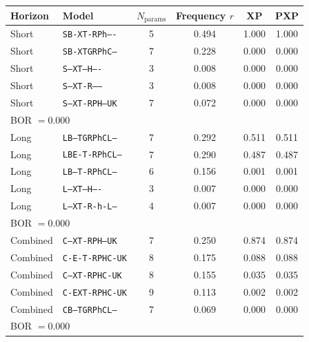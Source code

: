 \begin{tabular}{llcccc}
\toprule
Horizon & Model & $N_{\text{params}}$ & Frequency $r$ & XP & PXP \\
\midrule
Short & \texttt{SB-XT-RPh----} & 5 & 0.494 & 1.000 & 1.000 \\
Short & \texttt{SB-XTGRPhC---} & 7 & 0.228 & 0.000 & 0.000 \\
Short & \texttt{S--XT---H----} & 3 & 0.008 & 0.000 & 0.000 \\
Short & \texttt{S--XT-R------} & 3 & 0.008 & 0.000 & 0.000 \\
Short & \texttt{S--XT-RPH--UK} & 7 & 0.072 & 0.000 & 0.000 \\
\multicolumn{6}{l}{\quad\footnotesize BOR $= 0.000$} \\
\midrule
Long & \texttt{LB--TGRPhCL--} & 7 & 0.292 & 0.511 & 0.511 \\
Long & \texttt{LBE-T-RPhCL--} & 7 & 0.290 & 0.487 & 0.487 \\
Long & \texttt{LB--T-RPhCL--} & 6 & 0.156 & 0.001 & 0.001 \\
Long & \texttt{L--XT---H----} & 3 & 0.007 & 0.000 & 0.000 \\
Long & \texttt{L--XT-R-h-L--} & 4 & 0.007 & 0.000 & 0.000 \\
\multicolumn{6}{l}{\quad\footnotesize BOR $= 0.000$} \\
\midrule
Combined & \texttt{C--XT-RPH--UK} & 7 & 0.250 & 0.874 & 0.874 \\
Combined & \texttt{C-E-T-RPHC-UK} & 8 & 0.175 & 0.088 & 0.088 \\
Combined & \texttt{C--XT-RPHC-UK} & 8 & 0.155 & 0.035 & 0.035 \\
Combined & \texttt{C-EXT-RPHC-UK} & 9 & 0.113 & 0.002 & 0.002 \\
Combined & \texttt{CB--TGRPhCL--} & 7 & 0.069 & 0.000 & 0.000 \\
\multicolumn{6}{l}{\quad\footnotesize BOR $= 0.000$} \\
\bottomrule
\end{tabular}
